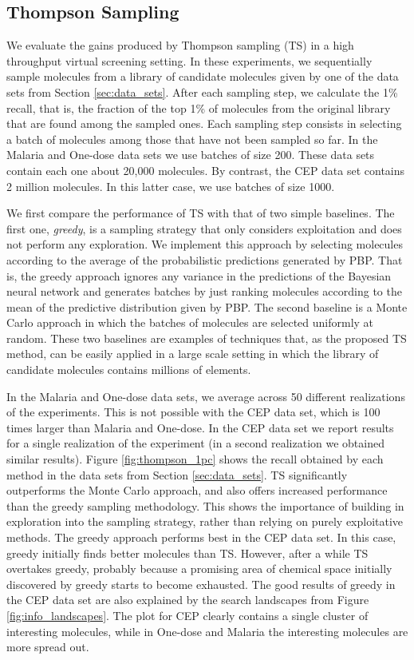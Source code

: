 \subsection{Thompson Sampling}

We evaluate the gains produced by Thompson sampling (TS) in a high throughput virtual screening setting. In these experiments, we sequentially sample molecules from a library of candidate molecules given by one of the data sets from Section \ref{sec:data_sets}. After each sampling step, we calculate the 1\% recall, that is, the fraction of the top 1\% of molecules from the original library that are found among the sampled ones. Each sampling step consists in selecting a batch of molecules among those that have not been sampled so far. In the Malaria and One-dose data sets we use batches of size 200. These data sets contain each one about 20,000 molecules. By contrast, the CEP data set contains 2 million molecules. In this latter case, we use batches of size 1000. 

We first compare the performance of TS with that of two simple baselines. The first one, \emph{greedy}, is a sampling strategy that only considers exploitation and does not perform any exploration. We implement this approach by selecting molecules according to the average of the probabilistic predictions generated by PBP. That is, the greedy approach ignores any variance in the predictions of the Bayesian neural network and generates batches by just ranking molecules according to the mean of the predictive distribution given by PBP. The second baseline is a Monte Carlo approach in which the batches of molecules are selected uniformly at random. These two baselines are examples of techniques that, as the proposed TS method, can be easily applied in a large scale setting in which the library of candidate molecules contains millions of elements.

In the Malaria and One-dose data sets, we average across 50 different realizations of the experiments. This is not possible with the CEP data set, which is 100 times larger than Malaria and One-dose. In the CEP data set we report results for a single realization of the experiment (in a second realization we obtained similar results). 
Figure \ref{fig:thompson_1pc} shows the recall obtained by each method in the data sets from 
Section \ref{sec:data_sets}. TS significantly outperforms the Monte Carlo approach, and also offers increased performance than the greedy sampling methodology. This shows the importance of building in exploration into the sampling strategy, rather than relying on purely exploitative methods. The greedy approach performs best in the CEP data set. In this case, greedy initially finds better molecules than TS. However, after a while TS overtakes greedy, probably because a promising area of chemical space 
initially discovered by greedy starts to become exhausted. The good results of greedy in the CEP data set are also explained by the search landscapes from Figure \ref{fig:info_landscapes}. The plot for CEP clearly contains a single cluster of interesting molecules, while in One-dose and Malaria the interesting molecules are more spread out.

